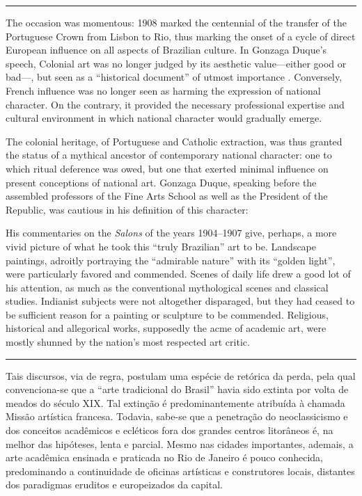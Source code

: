 \begin{center}\rule{0.5\linewidth}{0.5pt}\end{center}

The occasion was momentous: 1908 marked the centennial of the transfer
of the Portuguese Crown from Lisbon to Rio, thus marking the onset of a
cycle of direct European influence on all aspects of Brazilian culture.
In Gonzaga Duque's speech, Colonial art was no longer judged by its
aesthetic value---either good or bad---, but seen as a ``historical
document'' of utmost importance \autocite[p.
247]{gonzagaduque:1929contemporaneos}. Conversely, French influence was
no longer seen as harming the expression of national character. On the
contrary, it provided the necessary professional expertise and cultural
environment in which national character would gradually emerge.

The colonial heritage, of Portuguese and Catholic extraction, was thus
granted the status of a mythical ancestor of contemporary national
character: one to which ritual deference was owed, but one that exerted
minimal influence on present conceptions of national art. Gonzaga Duque,
speaking before the assembled professors of the Fine Arts School as well
as the President of the Republic, was cautious in his definition of this
character:

His commentaries on the \emph{Salons} of the years 1904--1907 give,
perhaps, a more vivid picture of what he took this ``truly Brazilian''
art to be. Landscape paintings, adroitly portraying the ``admirable
nature'' with its ``golden light'', were particularly favored and
commended. Scenes of daily life drew a good lot of his attention, as
much as the conventional mythological scenes and classical studies.
Indianist subjects were not altogether disparaged, but they had ceased
to be sufficient reason for a painting or sculpture to be commended.
Religious, historical and allegorical works, supposedly the acme of
academic art, were mostly shunned by the nation's most respected art
critic.

\begin{center}\rule{0.5\linewidth}{0.5pt}\end{center}

Tais discursos, via de regra, postulam uma espécie de retórica da perda,
pela qual convenciona-se que a ``arte tradicional do Brasil'' havia sido
extinta por volta de meados do século XIX. Tal extinção é
predominantemente atribuída à chamada Missão artística francesa.
Todavia, sabe-se que a penetração do neoclassicismo e dos conceitos
acadêmicos e ecléticos fora dos grandes centros litorâneos é, na melhor
das hipóteses, lenta e parcial. Mesmo nas cidades importantes, ademais,
a arte acadêmica ensinada e praticada no Rio de Janeiro é pouco
conhecida, predominando a continuidade de oficinas artísticas e
construtores locais, distantes dos paradigmas eruditos e europeizados da
capital.

